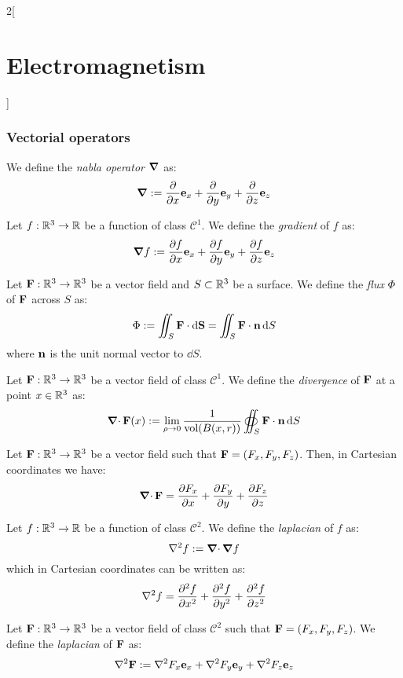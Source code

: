 \documentclass[../../../main.tex]{subfiles}
\begin{document}
\begin{multicols}{2}[\section{Electromagnetism}]
  \subsubsection{Vectorial operators}
  \begin{definition}
    We define the \emph{nabla operator} $\grad$ as: $$\grad:=\pdv{}{x}\boldsymbol{\mathrm{e}}_x+\pdv{}{y}\boldsymbol{\mathrm{e}}_y+\pdv{}{z}\boldsymbol{\mathrm{e}}_z$$
  \end{definition}
  \begin{definition}[Gradient]
    Let $f:\mathbb{R}^3\rightarrow\mathbb{R}$ be a function of class $\mathcal{C}^1$. We define the \emph{gradient} of $f$ as: $$\grad f:=\pdv{f}{x}\boldsymbol{\mathrm{e}}_x+\pdv{f}{y}\boldsymbol{\mathrm{e}}_y+\pdv{f}{z}\boldsymbol{\mathrm{e}}_z$$
  \end{definition}
  \begin{definition}[Flux]
    Let $\boldsymbol{\mathrm{F}}:\mathbb{R}^3\rightarrow\mathbb{R}^3$ be a vector field and $S\subset\mathbb{R}^3$ be a surface. We define the \emph{flux} $\Phi$ of $\boldsymbol{\mathrm{F}}$ across $S$ as:
    $$\Phi:=\iint_S\boldsymbol{\mathrm{F}}\cdot \dd{\boldsymbol{\mathrm{S}}}=\iint_S\boldsymbol{\mathrm{F}}\cdot\boldsymbol{\mathrm{n}} \dd{S}$$
    where $\boldsymbol{\mathrm{n}}$ is the unit normal vector to $\dd{S}$.
  \end{definition}
  \begin{definition}[Divergence]
    Let $\boldsymbol{\mathrm{F}}:\mathbb{R}^3\rightarrow\mathbb{R}^3$ be a vector field of class $\mathcal{C}^1$. We define the \emph{divergence} of $\boldsymbol{\mathrm{F}}$ at a point $x\in\mathbb{R}^3$ as:
    $$\operatorname{\boldsymbol{\mathrm{\nabla}}\cdot} \boldsymbol{\mathrm{F}}(x):=\lim_{\rho\to 0}\frac{1}{\text{vol}(B(x,r))}\oiint_{S}\boldsymbol{\mathrm{F}}\cdot\boldsymbol{\mathrm{n}} \dd{S}$$
  \end{definition}
  \begin{proposition}
    Let $\boldsymbol{\mathrm{F}}:\mathbb{R}^3\rightarrow\mathbb{R}^3$ be a vector field such that $\boldsymbol{\mathrm{F}}=(F_x,F_y,F_z)$. Then, in Cartesian coordinates we have: $$\operatorname{\boldsymbol{\mathrm{\nabla}}\cdot} \boldsymbol{\mathrm{F}}=\pdv{F_x}{x}+\pdv{F_y}{y}+\pdv{F_z}{z}$$
  \end{proposition}
  \begin{definition}[Laplacian]
    Let $f:\mathbb{R}^3\rightarrow\mathbb{R}$ be a function of class $\mathcal{C}^2$. We define the \emph{laplacian} of $f$ as: $$\laplacian f:=\divp\grad f$$
    which in Cartesian coordinates can be written as:
    $$\laplacian f=\pdv[2]{f}{x}+\pdv[2]{f}{y}+\pdv[2]{f}{z}$$
  \end{definition}
  \begin{definition}
    Let $\boldsymbol{\mathrm{F}}:\mathbb{R}^3\rightarrow\mathbb{R}^3$ be a vector field of class $\mathcal{C}^2$ such that $\boldsymbol{\mathrm{F}}=(F_x,F_y,F_z)$. We define the \emph{laplacian} of $\boldsymbol{\mathrm{F}}$ as: $$\laplacian\vf{F}:=\laplacian F_x\vf{e}_x+\laplacian F_y\vf{e}_y+\laplacian F_z\vf{e}_z$$
  \end{definition}

\end{multicols}
\end{document}
